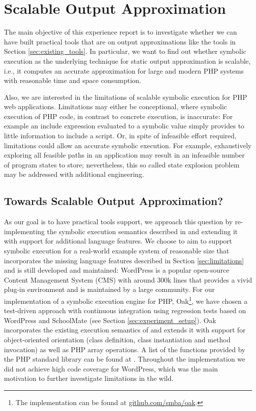 \documentclass[sigconf]{acmart}
\begin{document}
\section{Scalable Output Approximation}%
The main objective of this experience report is to investigate whether we can
have built practical tools that are on output approximations like the tools in
Section \ref{sec:existing_tools}. In particular, we want to find out whether
symbolic execution as the underlying technique for static output approximation
is scalable, i.e., it computes an accurate approximation for large and modern
PHP systems with reasonable time and space consumption.

Also, we are interested in the limitations of scalable symbolic execution for
PHP web applications. Limitations may either be conceptional, where symbolic
execution of PHP code, in contrast to concrete execution, is inaccurate: For
example an include expression evaluated to a symbolic value simply provides to
little information to include a script. Or, in spite of infeasible effort
required, limitations could allow an accurate symbolic execution. For example,
exhaustively exploring all feasible paths in an application may result in an
infeasible number of program states to store; nevertheless, this so called
state explosion problem may be addressed with additional engineering.

\subsection{Towards Scalable Output Approximation?}
As our goal is to have practical tools support, we approach this question by
re-implementing the symbolic execution semantics described in
\cite{Nguyen:2014:BCG:2635868.2635928} and extending it with support for
additional language features. We choose to aim to support symbolic execution
for a real-world example system of reasonable size that incorporates the
missing language features described in Section \ref{sec:limitations} and is
still developed and maintained: \textsf{WordPress} is a popular open-source
Content Management System (CMS) with around 300k lines that provides a vivid
plug-in environment and is maintained by a large community.
For our implementation of a symbolic execution engine for PHP,
\textsf{Oak}\footnote{The implementation can be found
at \url{github.com/smba/oak}.}, we have chosen a test-driven approach with
continuous integration using regression tests based on \textsf{WordPress} and \textsf{SchoolMate} (see Section \ref{sec:experiment_setup}). Oak incorporates the existing execution semantics
of \cite{Nguyen:2014:BCG:2635868.2635928} and extends it with support for
object-oriented orientation (class definition, class instantiation and method
invocation) as well as PHP array operations. A list of the functions provided
by the PHP standard library can be found at \cite{PHP}.
Throughout the implementation we did not achieve high code coverage for
WordPress, which was the main motivation to further investigate limitations in
the wild.
\end{document}
